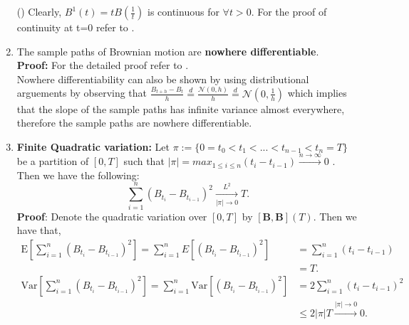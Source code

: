 \documentclass[12pt]{report}
\newcommand{\E}{\mathrm{E}}
\newcommand{\Var}{\mathrm{Var}}
\begin{document}
\begin{enumerate}
    () Clearly, $B^1(t) = tB(\frac{1}{t})$ is continuous for $\forall t > 0$. For the proof of continuity at t=0 refer to \cite{resnick_1992}.
    \item The sample paths of Brownian motion are \textbf{nowhere differentiable}.\\
    \textbf{Proof:} For the detailed proof refer to \cite{resnick_1992}.\\ Nowhere differentiability can also be shown by using distributional arguements by observing that $\frac{B_{t+h}-B_t}{h} \stackrel{d}{=} \frac{\mathcal{N}(0,h)}{h} \stackrel{d}{=} \mathcal{N}(0,\frac{1}{h}) $ which implies that the slope of the sample paths has infinite variance almost everywhere, therefore the sample paths are nowhere differentiable.
    \item \textbf{Finite Quadratic variation:} Let $\pi := \{0=t_0<t_1<...<t_{n-1}<t_n=T\}$ be a partition of $[0,T]$ such that $|\pi| = max_{1 \leq i \leq n} (t_i - t_{i-1})\xrightarrow{n\longrightarrow \infty} 0 $ .\\Then we have the following:
    \begin{equation}
       \sum_{i=1}^{n} (B_{t_i} - B_{t_{i-1}})^{2} \xrightarrow[|\pi|\longrightarrow 0]{L^{2}} T. 
    \end{equation}
    \textbf{Proof}: Denote the quadratic variation over $[0,T]$ by $[\mathbf{B},\mathbf{B}](T)$. Then we have that,\\
    \begin{align*}
       \E[\sum_{i=1}^{n} (B_{t_i} - B_{t_{i-1}})^{2}] = \sum_{i=1}^{n} E[(B_{t_i} - B_{t_{i-1}})^{2}] &= \sum_{i=1}^{n}(t_i - t_{i-1})\\
       &= T.\\
       \Var[\sum_{i=1}^{n} (B_{t_i} - B_{t_{i-1}})^{2}] = \sum_{i=1}^{n} \Var[(B_{t_i} - B_{t_{i-1}})^{2}]
       &=2\sum_{i=1}^{n}(t_i - t_{i-1})^{2}\\
       & \leq 2|\pi|T \xrightarrow{|\pi|\longrightarrow 0} 0.
    \end{align*}
    

\end{enumerate}
\end{document}
